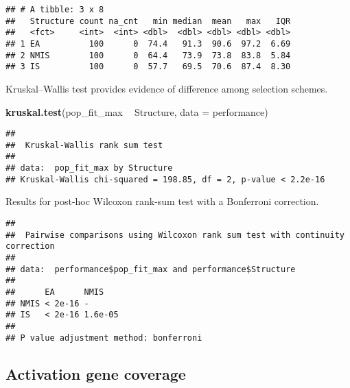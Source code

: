 \documentclass[]{book}
\newenvironment{Shaded}{\begin{snugshade}}{\end{snugshade}}
\newcommand{\DataTypeTok}[1]{\textcolor[rgb]{0.13,0.29,0.53}{#1}}
\newcommand{\KeywordTok}[1]{\textcolor[rgb]{0.13,0.29,0.53}{\textbf{#1}}}
\newcommand{\NormalTok}[1]{#1}
\newcommand{\OperatorTok}[1]{\textcolor[rgb]{0.81,0.36,0.00}{\textbf{#1}}}
\newcommand{\OtherTok}[1]{\textcolor[rgb]{0.56,0.35,0.01}{#1}}
\newcommand{\StringTok}[1]{\textcolor[rgb]{0.31,0.60,0.02}{#1}}
\begin{document}
\begin{verbatim}
## # A tibble: 3 x 8
##   Structure count na_cnt   min median  mean   max   IQR
##   <fct>     <int>  <int> <dbl>  <dbl> <dbl> <dbl> <dbl>
## 1 EA          100      0  74.4   91.3  90.6  97.2  6.69
## 2 NMIS        100      0  64.4   73.9  73.8  83.8  5.84
## 3 IS          100      0  57.7   69.5  70.6  87.4  8.30
\end{verbatim}

Kruskal--Wallis test provides evidence of difference among selection schemes.

\begin{Shaded}
\begin{Highlighting}[]
\KeywordTok{kruskal.test}\NormalTok{(pop_fit_max }\OperatorTok{~}\StringTok{ }\NormalTok{Structure, }\DataTypeTok{data =}\NormalTok{ performance)}
\end{Highlighting}
\end{Shaded}

\begin{verbatim}
## 
##  Kruskal-Wallis rank sum test
## 
## data:  pop_fit_max by Structure
## Kruskal-Wallis chi-squared = 198.85, df = 2, p-value < 2.2e-16
\end{verbatim}

Results for post-hoc Wilcoxon rank-sum test with a Bonferroni correction.

\begin{Shaded}
\end{Shaded}

\begin{verbatim}
## 
##  Pairwise comparisons using Wilcoxon rank sum test with continuity correction 
## 
## data:  performance$pop_fit_max and performance$Structure 
## 
##      EA      NMIS   
## NMIS < 2e-16 -      
## IS   < 2e-16 1.6e-05
## 
## P value adjustment method: bonferroni
\end{verbatim}

\hypertarget{activation-gene-coverage-5}{%
\subsection{Activation gene coverage}\label{activation-gene-coverage-5}}
\end{document}
